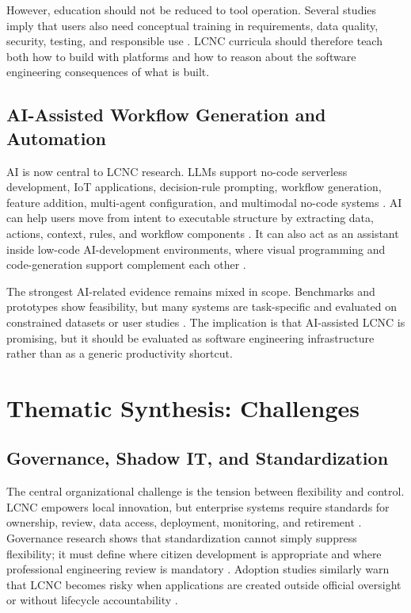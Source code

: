 \documentclass[conference]{IEEEtran}
\begin{document}
However, education should not be reduced to tool operation. Several studies imply that users also need conceptual training in requirements, data quality, security, testing, and responsible use \cite{p16,p26,p30,p46}. LCNC curricula should therefore teach both how to build with platforms and how to reason about the software engineering consequences of what is built.

\subsection{AI-Assisted Workflow Generation and Automation}
AI is now central to LCNC research. LLMs support no-code serverless development, IoT applications, decision-rule prompting, workflow generation, feature addition, multi-agent configuration, and multimodal no-code systems \cite{p04,p05,p06,p07,p08,p31,p32,p40}. AI can help users move from intent to executable structure by extracting data, actions, context, rules, and workflow components \cite{p31,p35}. It can also act as an assistant inside low-code AI-development environments, where visual programming and code-generation support complement each other \cite{p39}.

The strongest AI-related evidence remains mixed in scope. Benchmarks and prototypes show feasibility, but many systems are task-specific and evaluated on constrained datasets or user studies \cite{p01,p08,p31,p50}. The implication is that AI-assisted LCNC is promising, but it should be evaluated as software engineering infrastructure rather than as a generic productivity shortcut.

\section{Thematic Synthesis: Challenges}
\subsection{Governance, Shadow IT, and Standardization}
The central organizational challenge is the tension between flexibility and control. LCNC empowers local innovation, but enterprise systems require standards for ownership, review, data access, deployment, monitoring, and retirement \cite{p12,p13,p15}. Governance research shows that standardization cannot simply suppress flexibility; it must define where citizen development is appropriate and where professional engineering review is mandatory \cite{p12}. Adoption studies similarly warn that LCNC becomes risky when applications are created outside official oversight or without lifecycle accountability \cite{p14,p18}.
\end{document}
